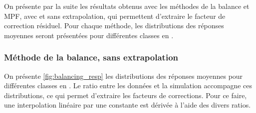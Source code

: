 \bigskip

On présente par la suite les résultats obtenus avec les méthodes de la balance et MPF, avec et sans extrapolation, qui permettent d'extraire le facteur de correction résiduel. Pour chaque méthode, les distributions des réponses moyennes seront présentées pour différentes classes en \aeta.

\subsubsection{Méthode de la balance, sans extrapolation}

On présente \cref{fig:balancing_resp} les distributions des réponses moyennes pour différentes classes en \aeta. Le ratio entre les données et la simulation accompagne ces distributions, ce qui permet d'extraire les facteurs de corrections. Pour ce faire, une interpolation linéaire par une constante est dérivée à l'aide des divers ratios.


